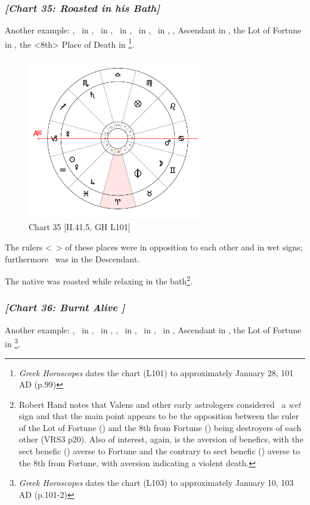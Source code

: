 \subsubsection{\textit{[Chart 35: Roasted in his Bath]}}
Another example: \Sun, \Venus\, in \Aquarius, \Moon\, in \Gemini, \Saturn\, in \Scorpio, \Jupiter\, in \Pisces, \Mars\, in \Cancer, \Mercury, Ascendant in \Capricorn, the Lot of Fortune in \Virgo, the <8th> Place of Death in \Aries
\footnote{\textit{Greek Horoscopes} dates the chart (L101) to approximately January 28, 101 AD (p.99)}.

\clearpage
\begin{figure}
\centering
\vspace{-20pt}
\includegraphics[width=0.68\textwidth]{charts/2_41_5}
\caption{Chart 35 [II.41.5, GH L101]}
\label{fig:chart35}
\end{figure}

The rulers <\Mercury\, \Mars> of these places were in opposition to each other and in wet signs; furthermore \Mars\, was in the Descendant. 

The native was roasted while relaxing in the bath\footnote{Robert Hand notes that Valens and other early astrologers considered \Capricorn\, a \textsl{wet} sign and that the main point appears to be the opposition between the ruler of the Lot of Fortune (\Mercury) and the 8th from Fortune (\Mars) being destroyers of each other (VRS3 p20).  Also of interest, again, is the aversion of benefics, with the sect benefic (\Venus) averse to Fortune and the contrary to sect benefic (\Jupiter) averse to the 8th from Fortune, with aversion indicating a violent death.}. 
\newpage
\subsubsection{\textit{[Chart 36: Burnt Alive ]}}
Another example: \Sun, \Venus\, in \Capricorn, \Moon\, in \Cancer, \Saturn, \Mercury\, in \Sagittarius, \Jupiter\, in \Taurus, \Mars\, in \Leo, Ascendant in \Aquarius, the Lot of Fortune in \Leo
\footnote{\textit{Greek Horoscopes} dates the chart (L103) to approximately January 10, 103 AD (p.101-2)}.

